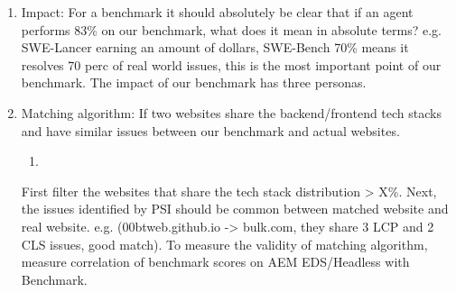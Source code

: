 \begin{enumerate}
    \item Impact: For a benchmark it should absolutely be clear that if an agent performs 83\% on our benchmark, what does it mean in absolute terms? e.g. SWE-Lancer earning an amount of dollars, SWE-Bench 70\% means it resolves 70 perc of real world issues, this is the most important point of our benchmark. The impact of our benchmark has three personas.
    \item Matching algorithm: If two websites share the backend/frontend tech stacks and have similar issues between our benchmark and actual websites.
    \begin{enumerate}
        \item 
    \end{enumerate}
    First filter the websites that share the tech stack distribution > X\%. Next, the issues identified by PSI should be common between matched website and real website. e.g. (00btweb.github.io -> bulk.com, they share 3 LCP and 2 CLS issues, good match). To measure the validity of matching algorithm, measure correlation of benchmark scores on AEM EDS/Headless with Benchmark.
    

\end{enumerate}

